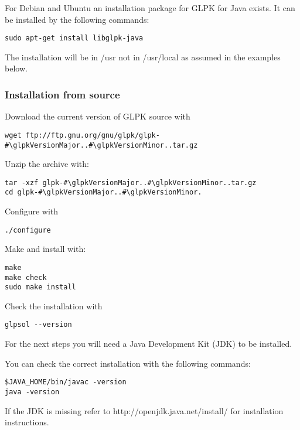 \documentclass[a4paper,11pt]{report}
\newcommand{\glpkVersionMajor}{4}
\newcommand{\glpkVersionMinor}{58}
\begin{document}
For Debian and Ubuntu an installation package for GLPK for Java exists.
It can be installed by the following commands:

\begin{lstlisting}
sudo apt-get install libglpk-java
\end{lstlisting}

The installation will be in /usr not in /usr/local as assumed in the examples
below.

\subsubsection{Installation from source}

Download the current version of GLPK source with

\begin{lstlisting}
wget ftp://ftp.gnu.org/gnu/glpk/glpk-#\glpkVersionMajor..#\glpkVersionMinor..tar.gz
\end{lstlisting}

Unzip the archive with:

\begin{lstlisting}
tar -xzf glpk-#\glpkVersionMajor..#\glpkVersionMinor..tar.gz
cd glpk-#\glpkVersionMajor..#\glpkVersionMinor.
\end{lstlisting}

Configure with

\begin{lstlisting}
./configure
\end{lstlisting}

Make and install with:

\begin{lstlisting}
make
make check
sudo make install
\end{lstlisting}

Check the installation with

\begin{lstlisting}
glpsol --version
\end{lstlisting}

For the next steps you will need a Java Development Kit (JDK) to be installed.

You can check the correct installation with the following commands:

\begin{lstlisting}
$JAVA_HOME/bin/javac -version
java -version
\end{lstlisting}

If the JDK is missing refer to http://openjdk.java.net/install/ for
installation instructions.
\end{document}
